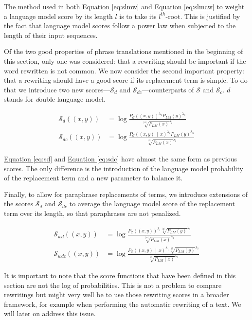 \documentclass[a4paper, 11pt, onepage]{scrreprt}
\newcommand\equaref[1]{\hyperref[#1]{Equation \ref*{#1}}}
\newcommand\card[1]{\lvert #1 \rvert}
\newcommand\given{\, \middle| \,}
\newcommand\proba[2][]{P_{#1} \left( #2 \right)}
\begin{document}
The method used in both \equaref{eq:slmw} and \equaref{eq:slmcw} to
weight a language model score by its length $l$ is to take its
$l^{th}$-root. This is justified by the fact that language model
scores follow a power law when subjected to the length of their input
sequences.

Of the two good properties of phrase translations mentioned in the
beginning of this section, only one was considered: that a rewriting
should be important if the word rewritten is not common. We now
consider the second important property: that a rewriting should have a
good score if its replacement term is simple. To do that we introduce
two new scores—$\mathcal{S}_d$ and $\mathcal{S}_{dc}$—counterparts of
$\mathcal{S}$ and $\mathcal{S}_c$. $d$ stands for \emph{d}ouble
language model.

\begin{align}
  \label{eq:sd}
  \mathcal{S}_d((x, y)) & = \log \frac%
  {\proba[\mathcal{C}]{(x, y)}^{\lambda_1}\proba[LM]{y}^{\lambda_3}}%
  {\sqrt[\card{w}]{\proba[LM]{x}}^{\lambda_2}} \\
  \label{eq:sdc}
  \mathcal{S}_{dc}((x, y)) & = \log \frac%
  {\proba[\mathcal{C}]{(x, y) \given x}^{\lambda_1}\proba[LM]{y}^{\lambda_3}}%
  {\sqrt[\card{x}]{\proba[LM]{x}}^{\lambda_2}}
\end{align}

\equaref{eq:sd} and \equaref{eq:sdc} have almost the same form as
previous scores. The only difference is the introduction of the
language model probability of the replacement term and a new parameter
to balance it.

Finally, to allow for paraphrase replacements of terms, we introduce
extensions of the scores $\mathcal{S}_d$ and $\mathcal{S}_{dc}$ to
average the language model score of the replacement term over its
length, so that paraphrases are not penalized.

\begin{align}
  \label{eq:sd}
  \mathcal{S}_{wd}((x, y)) & = \log \frac%
  {\proba[\mathcal{C}]{(x, y)}^{\lambda_1}\sqrt[\card{y}]{\proba[LM]{y}}^{\lambda_3}}%
  {\sqrt[\card{w}]{\proba[LM]{x}}^{\lambda_2}} \\
  \label{eq:sdc}
  \mathcal{S}_{wdc}((x, y)) & = \log \frac%
  {\proba[\mathcal{C}]{(x, y) \given x}^{\lambda_1}\sqrt[\card{y}]{\proba[LM]{y}}^{\lambda_3}}%
  {\sqrt[\card{x}]{\proba[LM]{x}}^{\lambda_2}}
\end{align}

It is important to note that the score functions that have been
defined in this section are not the log of probabilities. This is not
a problem to compare rewritings but might very well be to use those
rewriting scores in a broader framework, for example when performing
the automatic rewriting of a text. We will later on address this
issue.
\end{document}
